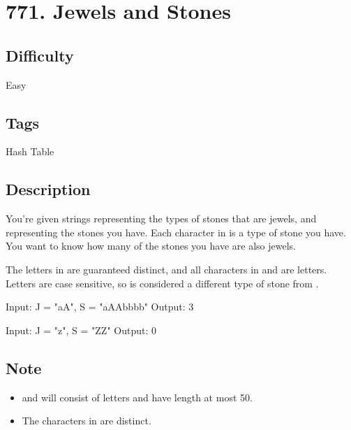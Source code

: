 \section*{771. Jewels and Stones}
\label{algo:771}

\subsection*{Difficulty}
Easy

\subsection*{Tags}
Hash Table

\subsection*{Description}
You're given strings  representing the types of stones that are jewels, and  representing the stones you have. Each character in  is a type of stone you have. You want to know how many of the stones you have are also jewels.

The letters in  are guaranteed distinct, and all characters in  and  are letters. Letters are case sensitive, so  is considered a different type of stone from .

\begin{example}
\begin{multilinecode}
Input: J = "aA", S = "aAAbbbb"
Output: 3
\end{multilinecode}
\end{example}

\begin{example}
\begin{multilinecode}
Input: J = "z", S = "ZZ"
Output: 0
\end{multilinecode}
\end{example}

\subsection*{Note}
\begin{itemize}
    \item {} and  will consist of letters and have length at most 50.
    \item The characters in  are distinct.
\end{itemize}

